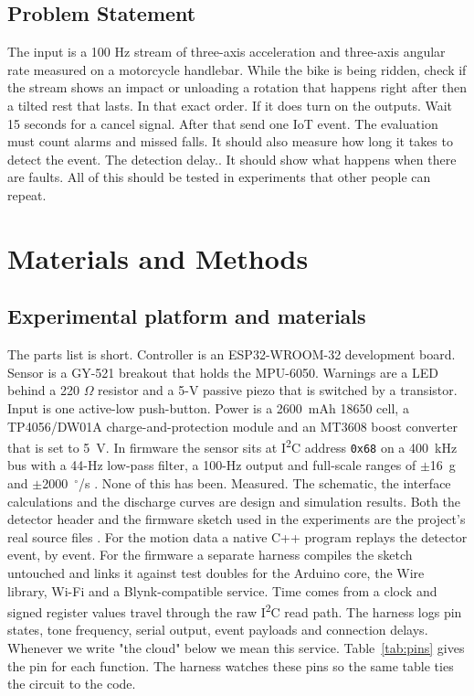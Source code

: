 \documentclass[10pt,a4paper]{article}
\newcommand{\degree}{\ensuremath{^{\circ}}}
\begin{document}
\subsection*{Problem Statement}
The input is a 100 Hz stream of three-axis acceleration and three-axis angular rate measured on a motorcycle handlebar. While the bike is being ridden, check if the stream shows an impact or unloading a rotation that happens right after then a tilted rest that lasts. In that exact order. If it does turn on the outputs. Wait 15 seconds for a cancel signal. After that send one IoT event. The evaluation must count alarms and missed falls. It should also measure how long it takes to detect the event. The detection delay.. It should show what happens when there are faults. All of this should be tested in experiments that other people can repeat.

\section{Materials and Methods}
\subsection{Experimental platform and materials}
The parts list is short. Controller is an ESP32-WROOM-32 development board. Sensor is a GY-521 breakout that holds the MPU-6050. Warnings are a LED behind a 220 $\Omega$ resistor and a 5-V passive piezo that is switched by a transistor. Input is one active-low push-button. Power is a 2600~mAh 18650 cell, a TP4056/DW01A charge-and-protection module and an MT3608 boost converter that is set to 5~V. In firmware the sensor sits at I\textsuperscript{2}C address \texttt{0x68} on a 400~kHz bus with a 44-Hz low-pass filter, a 100-Hz output and full-scale ranges of $\pm$16~g and $\pm$2000~$\degree$/s \cite{mpu6050datasheet}. None of this has been. Measured. The schematic, the interface calculations and the discharge curves are design and simulation results. Both the detector header and the firmware sketch used in the experiments are the project's real source files \cite{localcode}. For the motion data a native C++ program replays the detector event, by event. For the firmware a separate harness compiles the sketch untouched and links it against test doubles for the Arduino core, the Wire library, Wi-Fi and a Blynk-compatible service. Time comes from a clock and signed register values travel through the raw I\textsuperscript{2}C read path. The harness logs pin states, tone frequency, serial output, event payloads and connection delays. Whenever we write "the cloud" below we mean this service. Table~\ref{tab:pins} gives the pin for each function. The harness watches these pins so the same table ties the circuit to the code.
\end{document}
